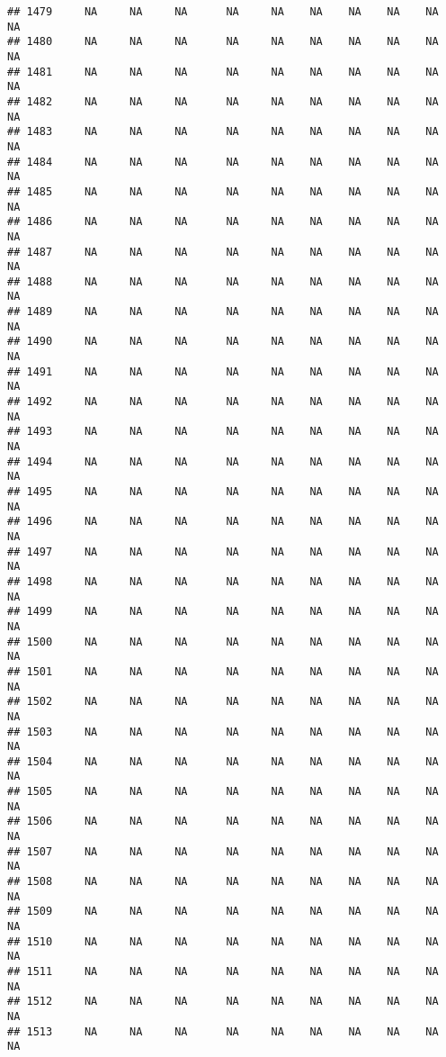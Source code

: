 \documentclass{article}\usepackage{graphicx, color}
\makeatletter
\newenvironment{kframe}{%
 \def\at@end@of@kframe{}%
 \ifinner\ifhmode%
  \def\at@end@of@kframe{\end{minipage}}%
  \begin{minipage}{\columnwidth}%
 \fi\fi%
 \def\FrameCommand##1{\hskip\@totalleftmargin \hskip-\fboxsep
 \colorbox{shadecolor}{##1}\hskip-\fboxsep
     \hskip-\linewidth \hskip-\@totalleftmargin \hskip\columnwidth}%
 \MakeFramed {\advance\hsize-\width
   \@totalleftmargin\z@ \linewidth\hsize
   \@setminipage}}%
 {\par\unskip\endMakeFramed%
 \at@end@of@kframe}
\newenvironment{knitrout}{}{} %
\makeatother
\begin{document}
\begin{knitrout}
\begin{kframe}
\begin{verbatim}
## 1479     NA     NA     NA      NA     NA    NA    NA    NA    NA     NA
## 1480     NA     NA     NA      NA     NA    NA    NA    NA    NA     NA
## 1481     NA     NA     NA      NA     NA    NA    NA    NA    NA     NA
## 1482     NA     NA     NA      NA     NA    NA    NA    NA    NA     NA
## 1483     NA     NA     NA      NA     NA    NA    NA    NA    NA     NA
## 1484     NA     NA     NA      NA     NA    NA    NA    NA    NA     NA
## 1485     NA     NA     NA      NA     NA    NA    NA    NA    NA     NA
## 1486     NA     NA     NA      NA     NA    NA    NA    NA    NA     NA
## 1487     NA     NA     NA      NA     NA    NA    NA    NA    NA     NA
## 1488     NA     NA     NA      NA     NA    NA    NA    NA    NA     NA
## 1489     NA     NA     NA      NA     NA    NA    NA    NA    NA     NA
## 1490     NA     NA     NA      NA     NA    NA    NA    NA    NA     NA
## 1491     NA     NA     NA      NA     NA    NA    NA    NA    NA     NA
## 1492     NA     NA     NA      NA     NA    NA    NA    NA    NA     NA
## 1493     NA     NA     NA      NA     NA    NA    NA    NA    NA     NA
## 1494     NA     NA     NA      NA     NA    NA    NA    NA    NA     NA
## 1495     NA     NA     NA      NA     NA    NA    NA    NA    NA     NA
## 1496     NA     NA     NA      NA     NA    NA    NA    NA    NA     NA
## 1497     NA     NA     NA      NA     NA    NA    NA    NA    NA     NA
## 1498     NA     NA     NA      NA     NA    NA    NA    NA    NA     NA
## 1499     NA     NA     NA      NA     NA    NA    NA    NA    NA     NA
## 1500     NA     NA     NA      NA     NA    NA    NA    NA    NA     NA
## 1501     NA     NA     NA      NA     NA    NA    NA    NA    NA     NA
## 1502     NA     NA     NA      NA     NA    NA    NA    NA    NA     NA
## 1503     NA     NA     NA      NA     NA    NA    NA    NA    NA     NA
## 1504     NA     NA     NA      NA     NA    NA    NA    NA    NA     NA
## 1505     NA     NA     NA      NA     NA    NA    NA    NA    NA     NA
## 1506     NA     NA     NA      NA     NA    NA    NA    NA    NA     NA
## 1507     NA     NA     NA      NA     NA    NA    NA    NA    NA     NA
## 1508     NA     NA     NA      NA     NA    NA    NA    NA    NA     NA
## 1509     NA     NA     NA      NA     NA    NA    NA    NA    NA     NA
## 1510     NA     NA     NA      NA     NA    NA    NA    NA    NA     NA
## 1511     NA     NA     NA      NA     NA    NA    NA    NA    NA     NA
## 1512     NA     NA     NA      NA     NA    NA    NA    NA    NA     NA
## 1513     NA     NA     NA      NA     NA    NA    NA    NA    NA     NA

\end{verbatim}
\end{kframe}
\end{knitrout}
\end{document}
